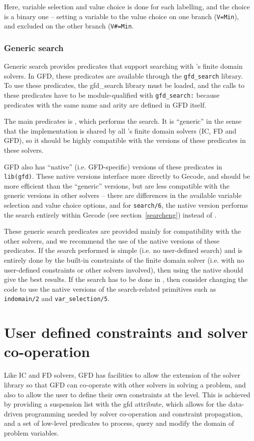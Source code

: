 Here, variable selection and value choice is done for each labelling,
and the choice is a binary one -- setting a variable to the value choice
on one branch (\texttt{V=Min}), and excluded on the other branch 
(\texttt{V\#\bsl=Min}.

\subsubsection{Generic search}
Generic search provides predicates that support searching with \eclipse's 
finite domain solvers. In GFD, these predicates are available through the
{\tt gfd_search} library. To use these predicates, the gfd_search library must
be loaded, and the calls to these predicates have to be module-qualified
with {\tt gfd_search:} because predicates with the same name and arity are defined
in GFD itself.

The main predicates is
, which performs the search. It is 
``generic'' in the sense that the implementation is shared
by all \eclipse's finite domain solvers (IC, FD and GFD), so it should be
highly compatible with the versions of these predicates in these solvers.

GFD also has ``native'' (i.e. GFD-specific) versions of these predicates
in {\tt lib(gfd)}. These native versions interface more directly to Gecode,
and should be more efficient than the ``generic'' versions, but are less 
compatible with the generic versions in other solvers -- there are differences
in the available variable selection and value choice options, and for 
{\tt search/6}, the native version performs the search entirely within
Gecode (see section~\ref{searcheng}) instead of \eclipse.

These generic search predicates are provided mainly for compatibility with
the other solvers, and we recommend the use of the native versions of these
predicates. If the search performed is simple (i.e. no user-defined search)
and is entirely done by the 
built-in constraints of the finite domain solver (i.e. with no user-defined 
constraints or other solvers involved), then using the native 
 should give the best results. If the search
has to be done in \eclipse, then consider changing the code to use the native 
versions of the search-related primitives such as {\tt indomain/2} and {\tt var_selection/5}.


\section{User defined constraints and solver co-operation}
Like IC and FD solvers, GFD has facilities to allow the extension of the 
solver library so that GFD can co-operate with other solvers in solving a
problem, and also to allow the user to define their own constraints at the {\eclipse}
level. This is achieved by providing a suspension list with the gfd attribute,
which allows for the data-driven programming needed by solver co-operation and
constraint propagation, and a set of low-level predicates to process,
 query and  modify the domain of problem variables.

